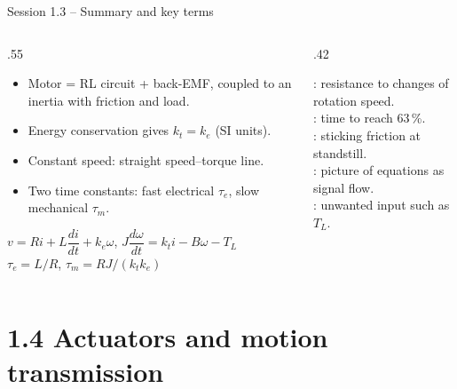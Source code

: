 \documentclass[aspectratio=169,10pt]{beamer}
\begin{document}
\begin{frame}{Session 1.3 -- Summary and key terms}
\begin{columns}[T]
\begin{column}{.55\textwidth}
\small
\begin{itemize}
\item Motor = RL circuit + back-EMF, coupled to an inertia with friction and load.
\item Energy conservation gives $k_t=k_e$ (SI units).
\item Constant speed: straight speed--torque line.
\item Two time constants: fast electrical $\tau_e$, slow mechanical $\tau_m$.
\end{itemize}
\begin{keybox}[Remember]
$v=Ri+L\dfrac{di}{dt}+k_e\omega$, \quad $J\dfrac{d\omega}{dt}=k_ti-B\omega-T_L$\\[1mm]
$\tau_e=L/R$, \quad $\tau_m=RJ/(k_tk_e)$
\end{keybox}
\end{column}
\begin{column}{.42\textwidth}
\begin{defbox}
\small
{}: resistance to changes of rotation speed.\\
: time to reach 63\,\%.\\
: sticking friction at standstill.\\
: picture of equations as signal flow.\\
: unwanted input such as $T_L$.
\end{defbox}
\end{column}
\end{columns}
\end{frame}

\section{1.4 Actuators and motion transmission}
\end{document}
